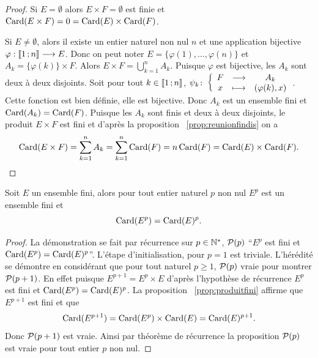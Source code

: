 \begin{proof}
  Si \(E = \emptyset\) alors \(E\times F = \emptyset\) est finie et \(\Card(E\times 
  F)=0 = \Card(E)\times \Card(F)\).

  Si \(E\neq\emptyset\), alors il existe un entier naturel non nul \(n\) et une 
  application bijective \(\fonctionR{\varphi}{\intervalleentier{1}{n}}{E}\). Donc 
  on peut noter \(E = \{\varphi(1),\ldots ,\varphi(n)\}\) et 
  \(A_k = \{\varphi(k)\}\times F\). Alors \(E\times F = \bigcup_{k = 1}^n A_k\).  
  Puisque \(\varphi\) est bijective, les \(A_k\) sont deux à deux disjoints.  
  Soit pour tout \(k\in\intervalleentier{1}{n}\), 
  \(\fonction{\psi_k}{F}{A_k}{x}{(\varphi(k),x)}\). Cette fonction est bien 
  définie, elle est bijective. Donc \(A_k\) est un ensemble fini et 
  \(\Card(A_k)=\Card(F)\). Puisque les \(A_k\) sont finis et deux à deux 
  disjoints, le produit \(E\times F\) est fini et d'après la proposition~
  \ref{prop:reunionfindis} on a
  \begin{equation}
    \Card(E\times F)=\sum_{k = 1}^{n} 
    A_k = \sum_{k = 1}^{n}\Card(F)=n\Card(F)=\Card(E)\times \Card(F).
  \end{equation}
\end{proof}

\begin{prop}
  Soit \(E\) un ensemble fini, alors pour tout entier naturel \(p\) non nul 
  \(E^p\) est un ensemble fini et
  \begin{equation}
    \Card(E^p)=\Card(E)^p.
  \end{equation}
\end{prop}

\begin{proof}
  La démonstration se fait par récurrence sur \(p\in\N^*\), \(\P(p)\) ``\(E^p\) 
  est fini et \(\Card(E^p) = \Card(E)^p\)''. L'étape d'initialisation, pour 
  \(p = 1\) est triviale. L'hérédité se démontre en considérant que pour tout 
  naturel \(p\geqslant 1\), \(\P(p)\) vraie pour montrer \(\P(p + 1)\). En effet 
  puisque \(E^{p + 1}=E^p \times E\) d'après l'hypothèse de récurrence \(E^p\) est 
  fini et \(\Card(E^p)=\Card(E)^p\). La proposition~
  \ref{prop:produitfini} affirme que \(E^{p + 1}\) est fini et que
  \begin{equation}
    \Card(E^{p + 1})=\Card(E^p)\times \Card(E)=\Card(E)^{p + 1}.
  \end{equation}
  Donc \(\P(p + 1)\) est vraie. Ainsi par théorème de récurrence la proposition 
  \(\P(p)\) est vraie pour tout entier \(p\) non nul.
\end{proof}

